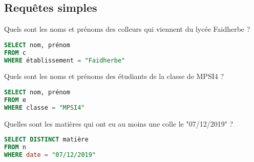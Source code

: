\subsection{Requêtes simples} 
\begin{Exercise}
Quels sont les noms et prénoms des colleurs qui viennent du lycée Faidherbe ?
\end{Exercise}
\begin{Answer}
\begin{lstlisting}[language=SQL]
SELECT nom, prénom
FROM c
WHERE établissement = "Faidherbe"
\end{lstlisting}
\end{Answer}
\begin{Exercise}
Quels sont les noms et prénoms des étudiants de la classe de MPSI4 ?
\end{Exercise}
\begin{Answer}
\begin{lstlisting}[language=SQL]
SELECT nom, prénom
FROM e
WHERE classe = "MPSI4"
\end{lstlisting}
\end{Answer}
\begin{Exercise}
Quelles sont les matières qui ont eu au moins une colle le "07/12/2019" ?
\end{Exercise}
\begin{Answer}
\begin{lstlisting}[language=SQL]
SELECT DISTINCT matière
FROM n
WHERE date = "07/12/2019"
\end{lstlisting}
\end{Answer}
